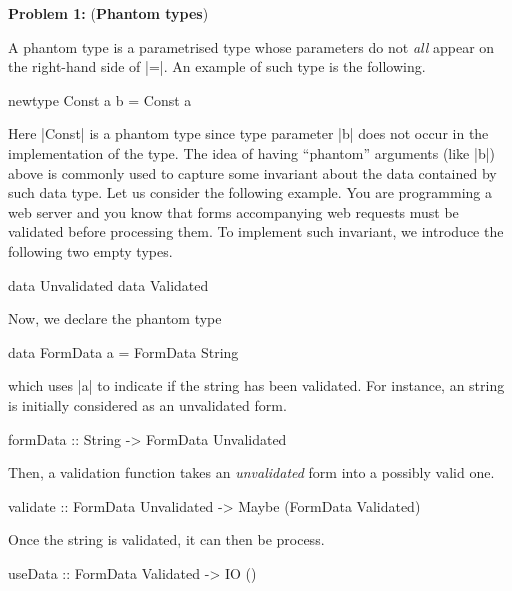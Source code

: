\documentclass[a4,11pt]{article}
\begin{document}
\newpage
\fi


%
%
\noindent
\textbf{Problem 1:} (\textbf{Phantom types})

A phantom type is a parametrised type whose parameters do not \emph{all} appear
on the right-hand side of |=|.
%
An example of such type is the following.
%
\begin{code}
newtype Const a b = Const a
\end{code}
%
Here |Const| is a phantom type since type parameter |b| does not occur in the
implementation of the type.
%
The idea of having ``phantom'' arguments (like |b|) above is commonly used to
capture some invariant about the data contained by such data type.
%
Let us consider the following example.
%
You are programming a web server and you know that forms accompanying web
requests must be validated before processing them.
%
To implement such invariant, we introduce the following two empty types.
%
\begin{code}
data Unvalidated
data Validated
\end{code}
%
Now, we declare the phantom type
\begin{code}
data FormData a = FormData String
\end{code}
which uses |a| to indicate if the string has been validated.
%
For instance, an string is initially considered as an unvalidated form.
%
\begin{code}
formData :: String -> FormData Unvalidated
\end{code}
%
Then, a validation function takes an \emph{unvalidated} form into
a possibly valid one.
%
\begin{code}
validate :: FormData Unvalidated -> Maybe (FormData Validated)
\end{code}
%
Once the string is validated, it can then be process.
%
\begin{code}
useData :: FormData Validated -> IO ()
\end{code}
\end{document}
